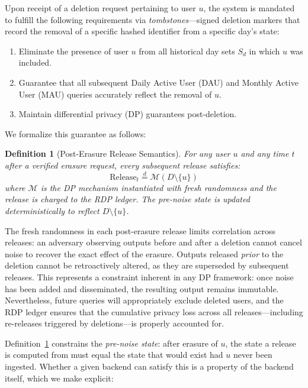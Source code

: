 \documentclass[sigconf,anonymous,review]{acmart}
\newtheorem{definition}[theorem]{Definition}
\begin{document}
Upon receipt of a deletion request pertaining to user \( u \), the system is mandated to fulfill the following requirements via \emph{tombstones}---signed deletion markers that record the removal of a specific hashed identifier from a specific day's state:

\begin{enumerate}
    \item Eliminate the presence of user \( u \) from all historical day sets \( S_d \) in which \( u \) was included.
    \item Guarantee that all subsequent Daily Active User (DAU) and Monthly Active User (MAU) queries accurately reflect the removal of \( u \).
    \item Maintain differential privacy (DP) guarantees post-deletion.
\end{enumerate}

We formalize this guarantee as follows:

\begin{definition}[Post-Erasure Release Semantics]
    \label{def:erasure}
    For any user $u$ and any time $t$ after a verified erasure request, every subsequent release satisfies:
    \[
        \text{Release}_t \stackrel{d}{=} \mathcal{M}(D \setminus \{u\})
    \]
    where $\mathcal{M}$ is the DP mechanism instantiated with fresh randomness and the release is charged to the RDP ledger. The pre-noise state is updated deterministically to reflect $D \setminus \{u\}$.
\end{definition}

The fresh randomness in each post-erasure release limits correlation across releases: an adversary observing outputs before and after a deletion cannot cancel noise to recover the exact effect of the erasure. Outputs released \emph{prior} to the deletion cannot be retroactively altered, as they are superseded by subsequent releases. This represents a constraint inherent in any DP framework: once noise has been added and disseminated, the resulting output remains immutable. Nevertheless, future queries will appropriately exclude deleted users, and the RDP ledger ensures that the cumulative privacy loss across all releases---including re-releases triggered by deletions---is properly accounted for.

Definition~\ref{def:erasure} constrains the \emph{pre-noise state}: after erasure of $u$, the state a release is computed from must equal the state that would exist had $u$ never been ingested. Whether a given backend can satisfy this is a property of the backend itself, which we make explicit:
\end{document}
